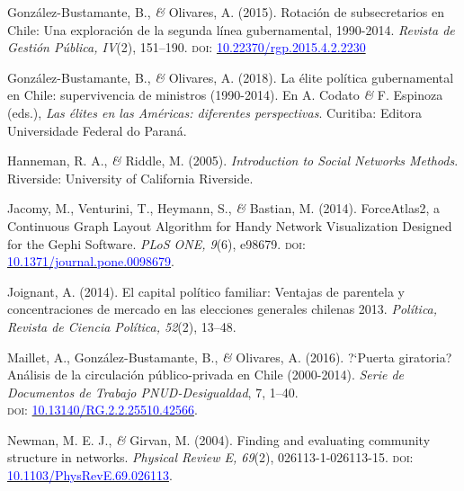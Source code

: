 \documentclass[a4paper]{tufte-handout}
\begin{document}
{\begin{list}{}
\item{\small González-Bustamante, B., {\itshape \&} Olivares, A. (2015). Rotación de subsecretarios en Chile: Una exploración de la segunda línea gubernamental, 1990-2014. {\itshape Revista de Gestión Pública, IV}(2), 151--190. {\scshape doi:} \href{https://doi.org/10.22370/rgp.2015.4.2.2230}{\textcolor{blue}{10.22370/rgp.2015.4.2.2230}}}

\item{\small González-Bustamante, B., {\itshape \&} Olivares, A. (2018). La élite política gubernamental en Chile: supervivencia de ministros (1990-2014). En A. Codato {\itshape \&} F. Espinoza (eds.),{ \itshape Las élites en las Américas: diferentes perspectivas}. Curitiba: Editora Universidade Federal do Paraná.}

\item{\small Hanneman, R. A., {\itshape \&} Riddle, M. (2005). {\itshape Introduction to Social Networks Methods}. Riverside: University of California Riverside.}

\item{\small Jacomy, M., Venturini, T., Heymann, S., {\itshape \&} Bastian, M. (2014). ForceAtlas2, a Continuous Graph Layout Algorithm for Handy Network Visualization Designed for the Gephi Software. {\itshape PLoS ONE, 9}(6), e98679. {\scshape doi:} \href{https://doi.org/10.1371/journal.pone.0098679}{\textcolor{blue}{10.1371/journal.pone.0098679}}.}

\item{\small Joignant, A. (2014). El capital político familiar: Ventajas de parentela y concentraciones de mercado en las elecciones generales chilenas 2013. {\itshape Política, Revista de Ciencia Política, 52}(2), 13--48.}

\item{\small Maillet, A., González-Bustamante, B., {\itshape \&} Olivares, A. (2016). ?`Puerta giratoria? Análisis de la circulación público-privada en Chile (2000-2014). {\itshape Serie de Documentos de Trabajo PNUD-Desigualdad}, 7,  1--40. \\ {\scshape doi:} \href{https://doi.org/10.13140/RG.2.2.25510.42566}{\textcolor{blue}{10.13140/RG.2.2.25510.42566}}.}

\item {\small Newman, M. E. J., {\itshape \&} Girvan, M. (2004). Finding and evaluating community structure in networks. {\itshape Physical Review E, 69}(2), 026113-1-026113-15. {\scshape doi:} \href{https://doi.org/10.1103/PhysRevE.69.026113}{\textcolor{blue}{10.1103/PhysRevE.69.026113}}.}


\end{list}}
\end{document}
